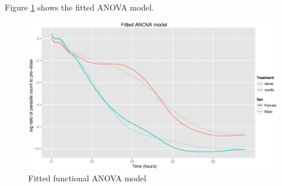 Figure \ref{fdfitted} shows the fitted ANOVA model.
\begin{figure}[p]
\includegraphics[width=150mm]{fdfitted.eps} 
\caption{Fitted functional ANOVA model}
\label{fdfitted}
\end{figure}

